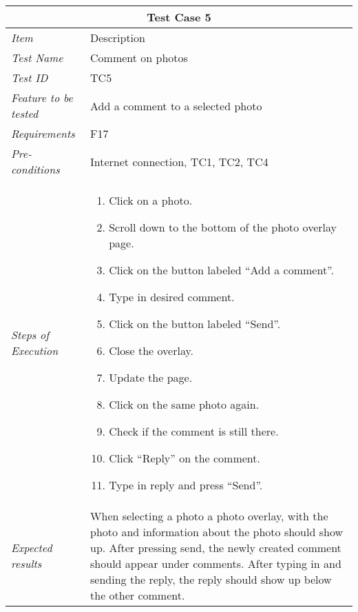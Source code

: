 %
\begin{minipage}{\linewidth}
\setlength{\tabcolsep}{15pt}
\centering
{}
\begin{tabular}{ |l|p{70mm}| }
	\hline
	\multicolumn{2}{|c|}{\cellcolor{gray!25} \textbf{Test Case 5}} \\
	\hline
	\it{\cellcolor{gray!25}Item} & {\cellcolor{gray!25} Description } \\
	\hline
	\it{\cellcolor{gray!25}Test Name } & Comment on photos \\ \hline
	\it{\cellcolor{gray!25}Test ID} & TC5 \\ \hline
	\it{\cellcolor{gray!25}Feature to be tested} & Add a comment to a selected photo \\ \hline
	\it{\cellcolor{gray!25}Requirements} & F17  \\ \hline
	\it{\cellcolor{gray!25}Pre-conditions} & Internet connection, TC1, TC2, TC4 \\ \hline
	\it{\cellcolor{gray!25}Steps of Execution} & \begin{enumerate}
	                                       \item Click on a photo.
	                                       \item Scroll down to the bottom of the photo overlay page.
	                                       \item Click on the button labeled “Add a comment”.
	                                       \item Type in desired comment.
	                                       \item Click on the button labeled “Send”.
	                                       \item Close the overlay.
	                                       \item Update the page.
	                                       \item Click on the same photo again.
	                                       \item Check if the comment is still there.
	                                       \item Click “Reply” on the comment.
	                                       \item Type in reply and press “Send”.
	                                     \end{enumerate} \\ \hline
	\it{\cellcolor{gray!25}Expected results} & When selecting a photo a photo overlay, with the photo and information about the photo should show up. After pressing send, the newly created comment should appear under comments. After typing in and sending the reply, the reply should show up below the other comment. \\
	\hline
\end{tabular}
\medskip
\end{minipage}
